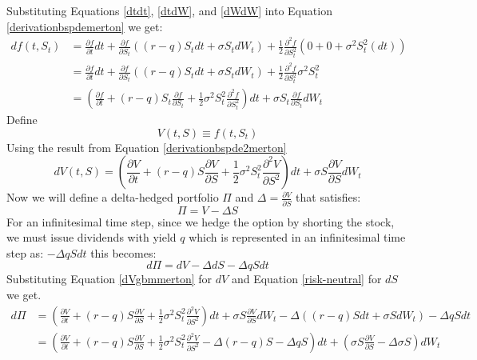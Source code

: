 \documentclass[12pt]{article}
\numberwithin{equation}{section}
\begin{document}
Substituting Equations \ref{dtdt}, \ref{dtdW}, and \ref{dWdW} into Equation 	\ref{derivationbspdemerton} we get:
\begin{equation}
	\begin{aligned}
		df(t,S_t)  &= \frac{\partial f}{\partial t}dt
		+ \frac{\partial f}{\partial S_t}
		\left((r-q)S_tdt + \sigma S_tdW_t\right)
		+ \frac{1}{2}
		\frac{\partial^2 f}{\partial S_t^2}
		\left(0 + 0 + \sigma^2S_t^2(dt)\right) \\
		&= \frac{\partial f}{\partial t}dt
		+ \frac{\partial f}{\partial S_t}
		\left((r-q)S_tdt + \sigma S_tdW_t\right)
		+ \frac{1}{2}
		\frac{\partial^2 f}{\partial S_t^2}
		\sigma^2S_t^2  \\
		&= (\frac{\partial f}{\partial t} + (r-q)S_t \frac{\partial f}{\partial S_t} + 
		\frac{1}{2}\sigma^2S_t^2\frac{\partial^2 f}{\partial S_t^2}) dt + \sigma S_t \frac{\partial f}{\partial S_t}dW_t
	\end{aligned}
	\label{derivationbspde2merton}
\end{equation}
Define 
\begin{equation}
	V(t,S)  \equiv f(t,S_t)
\end{equation}
Using the result from Equation \ref{derivationbspde2merton}
\begin{equation}
	dV(t,S) = (\frac{\partial V}{\partial t} + (r-q)S \frac{\partial V}{\partial S} + 
	\frac{1}{2}\sigma^2S_t^2\frac{\partial^2 V}{\partial S^2}) dt + \sigma S \frac{\partial V}{\partial S}dW_t
	\label{dVgbmmerton}
\end{equation}
\newline
Now we will define a delta-hedged portfolio $\Pi$ and $\Delta = \frac{\partial V}{\partial S}$ that satisfies:
\begin{equation}
	\Pi = V - \Delta S 
	\label{portfolioDefmerton}
\end{equation}
For an infinitesimal time step, since we hedge the option by shorting the stock, we must issue dividends with yield $q$ which is represented in an infinitesimal time step as: $- \Delta qS dt$ this becomes:
\begin{equation}
	d\Pi = dV - \Delta dS -\Delta qS dt
\end{equation}
Substituting Equation \ref{dVgbmmerton} for $dV$ and Equation \ref{risk-neutral} for $dS$ we get. 
\begin{equation}
	\begin{aligned}
		d\Pi &= (\frac{\partial V}{\partial t} + (r-q)S \frac{\partial V}{\partial S} + 
		\frac{1}{2}\sigma^2S_t^2\frac{\partial^2 V}{\partial S^2}) dt + \sigma S \frac{\partial V}{\partial S}dW_t - \Delta ((r-q)Sdt + \sigma SdW_t)  - \Delta qS dt \\
		&= (\frac{\partial V}{\partial t} + (r-q)S \frac{\partial V}{\partial S } + 
		\frac{1}{2}\sigma^2S_t^2\frac{\partial^2 V}{\partial S^2} - \Delta (r-q)S - \Delta qS ) dt + (\sigma S \frac{\partial V}{\partial S} - \Delta \sigma S ) dW_t
	\end{aligned}
	\label{dVgbm2merton}
\end{equation}
\end{document}
